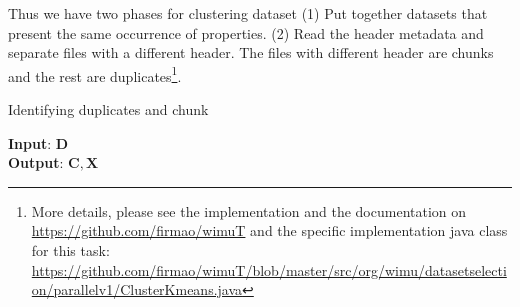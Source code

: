 \documentclass[sw]{iosart2x}
\begin{document}
Thus we have two phases for clustering dataset (1) Put together datasets that present the same occurrence of properties. (2) Read the header metadata and separate files with a different header. The files with different header are chunks and the rest are duplicates\footnote{More details, please see the implementation and the documentation on \url{https://github.com/firmao/wimuT} and the specific implementation java class for this task: \url{https://github.com/firmao/wimuT/blob/master/src/org/wimu/datasetselection/parallelv1/ClusterKmeans.java}}.


\begin{algorithm*} [htb] 
	\caption{Identifying duplicates and chunk}
	\label{alg:iss1}
    \begin{multicols}{2}
    	\textbf{Input}: $\mathbf{D}$  \\
    	\textbf{Output}: $\mathbf{C}, \mathbf{X}$  
    	\begin{algorithmic}[1]
    	     
    	         
    	        \EndFor
    	         
    	        \Else
    	        \EndIf
    	    \EndFor
    	     
     		 
    	\end{algorithmic}
	\end{multicols}
\end{algorithm*}    	
\end{document}

